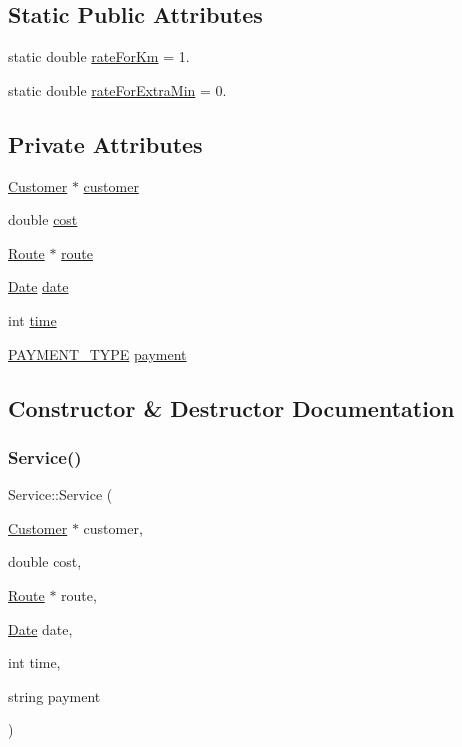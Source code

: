 \subsection*{Static Public Attributes}
\begin{DoxyCompactItemize}
\item 
static double \hyperlink{classService_aee8dfc7647ae55570b8240b9dff699f4}{rate\+For\+Km} = 1.
\item 
static double \hyperlink{classService_a6b98e1285e0eebbcddeab247336d0eb5}{rate\+For\+Extra\+Min} = 0.
\end{DoxyCompactItemize}
\subsection*{Private Attributes}
\begin{DoxyCompactItemize}
\item 
\hyperlink{classCustomer}{Customer} $\ast$ \hyperlink{classService_a1dbb66a7a35562c9f4b7f1654c286d75}{customer}
\item 
double \hyperlink{classService_a2ce3309e0dff48b5fe242512df62784b}{cost}
\item 
\hyperlink{classRoute}{Route} $\ast$ \hyperlink{classService_a3059a95085ce11e13a69ff19bc919f9a}{route}
\item 
\hyperlink{classDate}{Date} \hyperlink{classService_a00e1fb44faf15d76b7633b888780baeb}{date}
\item 
int \hyperlink{classService_ad48b41e25edbf42e8f0a0314adc8de4e}{time}
\item 
\hyperlink{Service_8h_a484d0c1796736fcbe8a3a730617b663f}{P\+A\+Y\+M\+E\+N\+T\+\_\+\+T\+Y\+PE} \hyperlink{classService_a832536bb266da871d50d14226bba3ac0}{payment}
\end{DoxyCompactItemize}


\subsection{Constructor \& Destructor Documentation}
\hypertarget{classService_a95b72be1a13715eda67acd99698ca0b4}{}\label{classService_a95b72be1a13715eda67acd99698ca0b4} 
\subsubsection{\texorpdfstring{Service()}{Service()}}
{\footnotesize\ttfamily Service\+::\+Service (\begin{DoxyParamCaption}\item[{\hyperlink{classCustomer}{Customer} $\ast$}]{customer,  }\item[{double}]{cost,  }\item[{\hyperlink{classRoute}{Route} $\ast$}]{route,  }\item[{\hyperlink{classDate}{Date}}]{date,  }\item[{int}]{time,  }\item[{string}]{payment }\end{DoxyParamCaption})}

